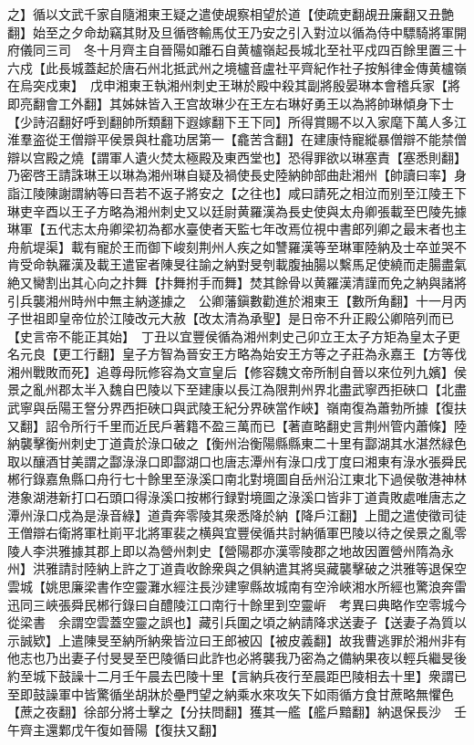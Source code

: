 之】循以文武千家自隨湘東王疑之遣使覘察相望於道【使疏吏翻覘丑廉翻又丑艶翻】始至之夕命劫竊其財及旦循啓輸馬仗王乃安之引入對泣以循為侍中驃騎將軍開府儀同三司　冬十月齊主自晉陽如離石自黄櫨嶺起長城北至社平戍四百餘里置三十六戍【此長城蓋起於唐石州北抵武州之境櫨音盧社平齊紀作社子按斛律金傳黄櫨嶺在烏突戍東】　戊申湘東王執湘州刺史王琳於殿中殺其副將殷晏琳本會稽兵家【將即亮翻會工外翻】其姊妹皆入王宫故琳少在王左右琳好勇王以為將帥琳傾身下士【少詩沼翻好呼到翻帥所類翻下遐嫁翻下王下同】所得賞賜不以入家麾下萬人多江淮羣盗從王僧辯平侯景與杜龕功居第一【龕苦含翻】在建康恃寵縱暴僧辯不能禁僧辯以宫殿之燒【謂軍人遺火焚太極殿及東西堂也】恐得罪欲以琳塞責【塞悉則翻】乃密啓王請誅琳王以琳為湘州琳自疑及禍使長史陸納帥部曲赴湘州【帥讀曰率】身詣江陵陳謝謂納等曰吾若不返子將安之【之往也】咸曰請死之相泣而别至江陵王下琳吏辛酉以王子方略為湘州刺史又以廷尉黄羅漢為長史使與太舟卿張載至巴陵先據琳軍【五代志太舟卿梁初為都水臺使者天監七年改焉位視中書郎列卿之最末者也主舟航堤渠】載有寵於王而御下峻刻荆州人疾之如讐羅漢等至琳軍陸納及士卒並哭不肯受命執羅漢及載王遣宦者陳旻往諭之納對旻刳載腹抽腸以繫馬足使繞而走腸盡氣絶又臠割出其心向之抃舞【抃舞拊手而舞】焚其餘骨以黄羅漢清謹而免之納與諸將引兵襲湘州時州中無主納遂據之　公卿藩鎭數勸進於湘東王【數所角翻】十一月丙子世祖即皇帝位於江陵改元大赦【改太清為承聖】是日帝不升正殿公卿陪列而已【史言帝不能正其始】　丁丑以宜豐侯循為湘州刺史己卯立王太子方矩為皇太子更名元良【更工行翻】皇子方智為晉安王方略為始安王方等之子莊為永嘉王【方等伐湘州戰敗而死】追尊母阮修容為文宣皇后【修容魏文帝所制自晉以來位列九嬪】侯景之亂州郡太半入魏自巴陵以下至建康以長江為限荆州界北盡武寧西拒硤口【北盡武寧與岳陽王詧分界西拒硤口與武陵王紀分界硤當作峽】嶺南復為蕭勃所據【復扶又翻】詔令所行千里而近民戶著籍不盈三萬而已【著直略翻史言荆州管内蕭條】陸納襲擊衡州刺史丁道貴於淥口破之【衡州治衡陽縣縣東二十里有酃湖其水湛然緑色取以釀酒甘美謂之酃淥淥口即酃湖口也唐志潭州有淥口戌丁度曰湘東有淥水張舜民郴行錄嘉魚縣口舟行七十餘里至淥溪口南北對境圖自岳州沿江東北下過侯敬港神林港象湖港新打口石頭口得淥溪口按郴行録對境圖之淥溪口皆非丁道貴敗處唯唐志之潭州淥口戍為是淥音綠】道貴奔零陵其衆悉降於納【降戶江翻】上聞之遣使徵司徒王僧辯右衛將軍杜崱平北將軍裴之横與宜豐侯循共討納循軍巴陵以待之侯景之亂零陵人李洪雅據其郡上即以為營州刺史【營陽郡亦漢零陵郡之地故因置營州隋為永州】洪雅請討陸納上許之丁道貴收餘衆與之俱納遣其將吳藏襲擊破之洪雅等退保空雲城【姚思廉梁書作空靈灘水經注長沙建寧縣故城南有空泠峽湘水所經也驚浪奔雷迅同三峽張舜民郴行錄曰自醴陵江口南行十餘里到空靈㟁　考異曰典略作空零城今從梁書　余謂空雲蓋空靈之誤也】藏引兵圍之頃之納請降求送妻子【送妻子為質以示誠欵】上遣陳旻至納所納衆皆泣曰王郎被囚【被皮義翻】故我曹逃罪於湘州非有他志也乃出妻子付旻旻至巴陵循曰此詐也必將襲我乃密為之備納果夜以輕兵繼旻後約至城下鼓譟十二月壬午晨去巴陵十里【言納兵夜行至晨距巴陵相去十里】衆謂已至即鼓譟軍中皆驚循坐胡牀於壘門望之納乘水來攻矢下如雨循方食甘蔗略無懼色【蔗之夜翻】徐部分將士擊之【分扶問翻】獲其一艦【艦戶黯翻】納退保長沙　壬午齊主還鄴戊午復如晉陽【復扶又翻】

